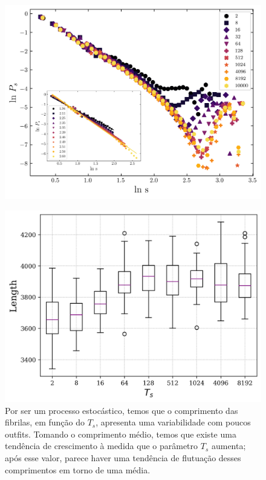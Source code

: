 \documentclass{article}
\begin{document}
\begin{figure}[H]
    \centering
    \includegraphics[width=\textwidth]{figures/ava.png}

    \caption{} 

    \label{R7}
\end{figure}










\begin{figure}[H]
    \centering
    \includegraphics[width=\textwidth]{figures/box_plot_length.png}

    \caption{Por ser um processo estocástico, temos que o comprimento das fibrilas, em função do $T_{s}$, apresenta uma variabilidade com poucos outfits. Tomando o comprimento médio, temos que existe uma tendência de crescimento à medida que o parâmetro $T_{s}$ aumenta; após esse valor, parece haver uma tendência de flutuação desses comprimentos em torno de uma média.} 

    \label{}
\end{figure}
\end{document}
